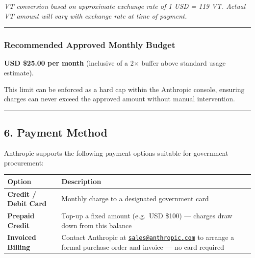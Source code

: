 \documentclass[
]{article}
\newcounter{none} %
\begin{document}
\emph{VT conversion based on approximate exchange rate of 1 USD = 119
VT. Actual VT amount will vary with exchange rate at time of payment.}

\begin{center}\rule{0.5\linewidth}{0.5pt}\end{center}

\subsubsection{Recommended Approved Monthly
Budget}\label{recommended-approved-monthly-budget}

\textbf{USD \$25.00 per month} (inclusive of a 2× buffer above standard
usage estimate).

This limit can be enforced as a hard cap within the Anthropic console,
ensuring charges can never exceed the approved amount without manual
intervention.

\begin{center}\rule{0.5\linewidth}{0.5pt}\end{center}

\subsection{6. Payment Method}\label{payment-method}

Anthropic supports the following payment options suitable for government
procurement:

{\def\LTcaptype{none} %
\begin{longtable}[]{@{}
  >{\raggedright\arraybackslash}p{}
  >{\raggedright\arraybackslash}p{}@{}}
\toprule\noalign{}
\begin{minipage}[b]{\linewidth}\raggedright
Option
\end{minipage} & \begin{minipage}[b]{\linewidth}\raggedright
Description
\end{minipage} \\
\midrule\noalign{}
\endhead
\bottomrule\noalign{}
\endlastfoot
\textbf{Credit / Debit Card} & Monthly charge to a designated government
card \\
\textbf{Prepaid Credit} & Top-up a fixed amount (e.g.~USD \$100) ---
charges draw down from this balance \\
\textbf{Invoiced Billing} & Contact Anthropic at
\href{mailto:sales@anthropic.com}{\nolinkurl{sales@anthropic.com}} to
arrange a formal purchase order and invoice --- no card required \\
\end{longtable}
}
\end{document}
